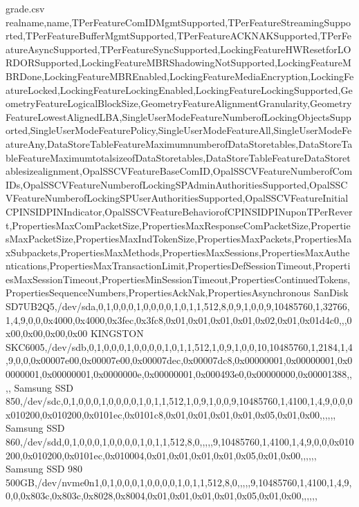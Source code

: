 
\begin{filecontents*}{grade.csv}
realname,name,TPerFeatureComIDMgmtSupported,TPerFeatureStreamingSupported,TPerFeatureBufferMgmtSupported,TPerFeatureACKNAKSupported,TPerFeatureAsyncSupported,TPerFeatureSyncSupported,LockingFeatureHWResetforLORDORSupported,LockingFeatureMBRShadowingNotSupported,LockingFeatureMBRDone,LockingFeatureMBREnabled,LockingFeatureMediaEncryption,LockingFeatureLocked,LockingFeatureLockingEnabled,LockingFeatureLockingSupported,GeometryFeatureLogicalBlockSize,GeometryFeatureAlignmentGranularity,GeometryFeatureLowestAlignedLBA,SingleUserModeFeatureNumberofLockingObjectsSupported,SingleUserModeFeaturePolicy,SingleUserModeFeatureAll,SingleUserModeFeatureAny,DataStoreTableFeatureMaximumnumberofDataStoretables,DataStoreTableFeatureMaximumtotalsizeofDataStoretables,DataStoreTableFeatureDataStoretablesizealignment,OpalSSCVFeatureBaseComID,OpalSSCVFeatureNumberofComIDs,OpalSSCVFeatureNumberofLockingSPAdminAuthoritiesSupported,OpalSSCVFeatureNumberofLockingSPUserAuthoritiesSupported,OpalSSCVFeatureInitialCPINSIDPINIndicator,OpalSSCVFeatureBehaviorofCPINSIDPINuponTPerRevert,PropertiesMaxComPacketSize,PropertiesMaxResponseComPacketSize,PropertiesMaxPacketSize,PropertiesMaxIndTokenSize,PropertiesMaxPackets,PropertiesMaxSubpackets,PropertiesMaxMethods,PropertiesMaxSessions,PropertiesMaxAuthentications,PropertiesMaxTransactionLimit,PropertiesDefSessionTimeout,PropertiesMaxSessionTimeout,PropertiesMinSessionTimeout,PropertiesContinuedTokens,PropertiesSequenceNumbers,PropertiesAckNak,PropertiesAsynchronous
SanDisk SD7UB2Q5,/dev/sda,0,1,0,0,0,1,0,0,0,0,1,0,1,1,512,8,0,9,1,0,0,9,10485760,1,32766,1,4,9,0,0,0x4000,0x4000,0x3fec,0x3fc8,0x01,0x01,0x01,0x01,0x02,0x01,0x01d4c0,,,0x00,0x00,0x00,0x00
KINGSTON SKC6005,/dev/sdb,0,1,0,0,0,1,0,0,0,0,1,0,1,1,512,1,0,9,1,0,0,10,10485760,1,2184,1,4,9,0,0,0x00007e00,0x00007e00,0x00007dec,0x00007dc8,0x00000001,0x00000001,0x00000001,0x00000001,0x0000000e,0x00000001,0x000493e0,0x00000000,0x00001388,,,,
Samsung SSD 850,/dev/sdc,0,1,0,0,0,1,0,0,0,0,1,0,1,1,512,1,0,9,1,0,0,9,10485760,1,4100,1,4,9,0,0,0x010200,0x010200,0x0101ec,0x0101c8,0x01,0x01,0x01,0x01,0x05,0x01,0x00,,,,,,
Samsung SSD 860,/dev/sdd,0,1,0,0,0,1,0,0,0,0,1,0,1,1,512,8,0,,,,,9,10485760,1,4100,1,4,9,0,0,0x010200,0x010200,0x0101ec,0x010004,0x01,0x01,0x01,0x01,0x05,0x01,0x00,,,,,,
Samsung SSD 980 500GB,/dev/nvme0n1,0,1,0,0,0,1,0,0,0,0,1,0,1,1,512,8,0,,,,,9,10485760,1,4100,1,4,9,0,0,0x803c,0x803c,0x8028,0x8004,0x01,0x01,0x01,0x01,0x05,0x01,0x00,,,,,,
\end{filecontents*}

